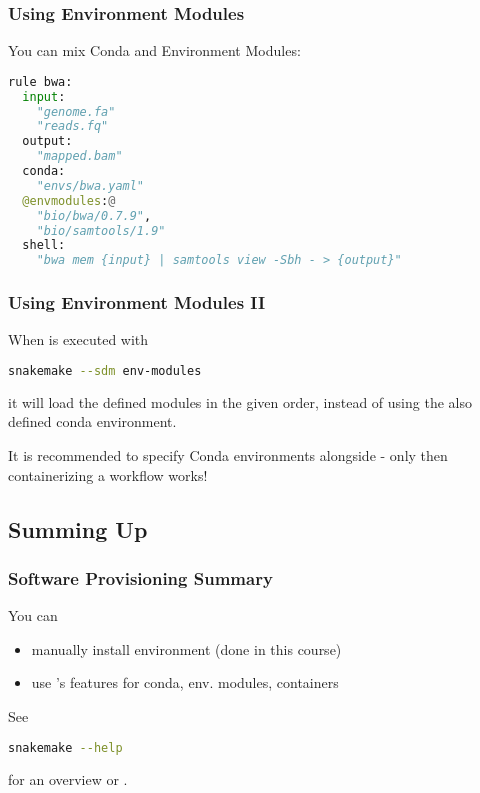 \begin{frame}[fragile]
  \frametitle{Using Environment Modules}
  You can mix Conda and Environment Modules:
  \begin{lstlisting}[language=Python,style=Python]
rule bwa:
  input:
    "genome.fa"
    "reads.fq"
  output:
    "mapped.bam"
  conda:
    "envs/bwa.yaml"
  @envmodules:@
    "bio/bwa/0.7.9",
    "bio/samtools/1.9"
  shell:
    "bwa mem {input} | samtools view -Sbh - > {output}"
  \end{lstlisting}
\end{frame}

\begin{frame}[fragile]
  \frametitle{Using Environment Modules II}
  When \Snakemake{} is executed with 
  \begin{lstlisting}[language=Bash, style=Shell]
snakemake --sdm env-modules
  \end{lstlisting}
  it will load the defined modules in the given order, instead of using the also defined conda environment.
  \pause
  \begin{hint}
  	It is recommended to specify Conda environments alongside - only then containerizing a workflow works!
  \end{hint}
\end{frame}

\subsection{Summing Up}

\begin{frame}[fragile]
  \frametitle{Software Provisioning Summary}
  You can
  \begin{itemize}
  	\item manually install environment (done in this course)
  	\item use \Snakemake's features for conda, env. modules, containers
  \end{itemize}
   See 
   \begin{lstlisting}[language=Bash, style=Shell]
snakemake --help
   \end{lstlisting}
   for an overview or .
\end{frame} 
